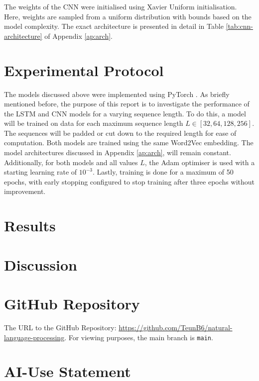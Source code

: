 \documentclass[12pt,a4paper,english]{article}
\begin{document}
The weights of the CNN were initialised using Xavier Uniform initialisation. Here, weights are sampled from a uniform distribution with bounds based on the model complexity. The exact architecture is presented in detail in Table \ref{tab:cnn-architecture} of Appendix \ref{ap:arch}.


\section{Experimental Protocol}
The models discussed above were implemented using PyTorch \cite{paszke2019pytorchimperativestylehighperformance}. As briefly mentioned before, the purpose of this report is to investigate the performance of the LSTM and CNN models for a varying sequence length. To do this, a model will be trained on data for each maximum sequence length $L \in [32,64,128,256]$. The sequences will be padded or cut down to the required length for ease of computation. Both models are trained using the same Word2Vec embedding. The model architectures discussed in Appendix \ref{ap:arch}, will remain constant. Additionally, for both models and all values $L$, the Adam optimiser is used with a starting learning rate of $10^{-3}$. Lastly, training is done for a maximum of 50 epochs, with early stopping configured to stop training after three epochs without improvement.

\section{Results}

\section{Discussion}

\newpage
\printbibliography

\suppressfloats[t]
\newpage
\appendix
\section{GitHub Repository}

The URL to the GitHub Repository: \href{https://github.com/TeunB6/natural-language-processing}{https://github.com/TeunB6/natural-language-processing}. For viewing purposes, the main branch is \texttt{main}.

\section{AI-Use Statement}
\end{document}
